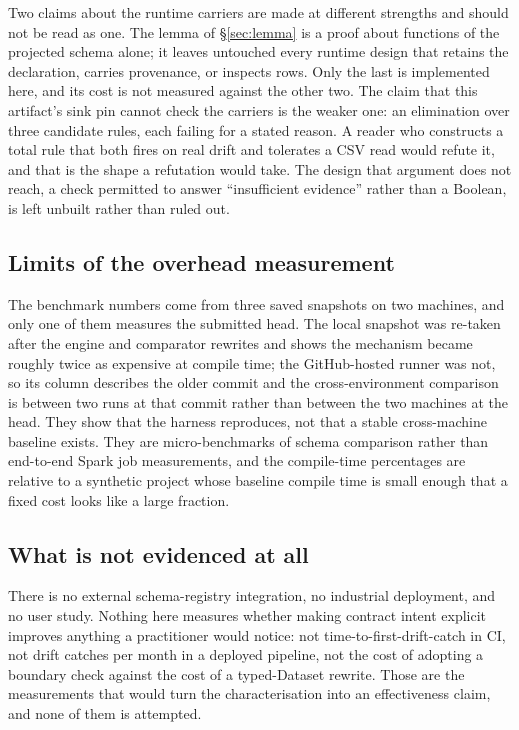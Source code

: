 Two claims about the runtime carriers are made at different strengths and should not be read as one. The lemma of \S\ref{sec:lemma} is a proof about functions of the projected schema alone; it leaves untouched every runtime design that retains the declaration, carries provenance, or inspects rows. Only the last is implemented here, and its cost is not measured against the other two. The claim that this artifact's sink pin cannot check the carriers is the weaker one: an elimination over three candidate rules, each failing for a stated reason. A reader who constructs a total rule that both fires on real drift and tolerates a CSV read would refute it, and that is the shape a refutation would take. The design that argument does not reach, a check permitted to answer ``insufficient evidence'' rather than a Boolean, is left unbuilt rather than ruled out.

\subsection{Limits of the overhead measurement}

The benchmark numbers come from three saved snapshots on two machines, and only one of them measures the submitted head. The local snapshot was re-taken after the engine and comparator rewrites and shows the mechanism became roughly twice as expensive at compile time; the GitHub-hosted runner was not, so its column describes the older commit and the cross-environment comparison is between two runs at that commit rather than between the two machines at the head. They show that the harness reproduces, not that a stable cross-machine baseline exists. They are micro-benchmarks of schema comparison rather than end-to-end Spark job measurements, and the compile-time percentages are relative to a synthetic project whose baseline compile time is small enough that a fixed cost looks like a large fraction.

\subsection{What is not evidenced at all}
\label{sec:limits-effectiveness}

There is no external schema-registry integration, no industrial deployment, and no user study. Nothing here measures whether making contract intent explicit improves anything a practitioner would notice: not time-to-first-drift-catch in CI, not drift catches per month in a deployed pipeline, not the cost of adopting a boundary check against the cost of a typed-Dataset rewrite. Those are the measurements that would turn the characterisation into an effectiveness claim, and none of them is attempted.

